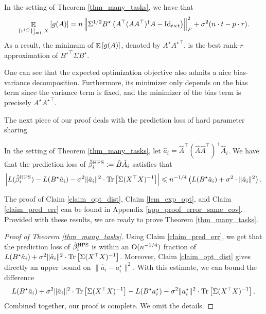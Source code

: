 	\begin{claim}\label{lem_exp_opt}
		In the setting of Theorem \ref{thm_many_tasks}, we have that
		\begin{align}
			\mathop{\mathbb{E}}_{\{\varepsilon^{(j)}\}_{j=1}^t, X}\left[ g(A) \right] = n \left\| \Sigma^{1/2} B^{\star} \left({A^{\top} (AA^{\top})^{\dagger} A - \operatorname{Id}_{t\times t}}\right) \right\|_{F}^2 + \sigma^2 (n\cdot t - p \cdot r). \label{eq_gA}
		\end{align}
		As a result, the minimum of $\mathop{\mathbb{E}}\left[ g(A) \right]$, denoted by $A^{\star}{A^\star}^\top$, is the best rank-$r$ approximation of ${B^{\star}}^{\top}\Sigma B^{\star}$.
	\end{claim}

	 One can see that the expected optimization objective also admits a nice bias-variance decomposition.
	Furthermore, its minimizer only depends on the bias term since the variance term is fixed, and the minimizer of the bias term is precisely $A^{\star} {A^{\star}}^{\top}$.

	The next piece of our proof deals with the prediction loss of hard parameter sharing.
	\begin{claim}\label{claim_pred_err}
		In the setting of Theorem \ref{thm_many_tasks},
		let $\hat{a}_i = \hat{A}^{\top} (\hat{A}\hat{A}^{\top})^{+} \hat{A}_i$.
		We have that the prediction loss of $\hat{\beta}_i^{\textup{HPS}} := \hat{B} \hat{A}_i$ satisfies that
		\begin{align*}
			{\left| {L(\hat{\beta}_i^{\textup{HPS}}) - L(B^{\star} \hat{a}_i) - \sigma^2 \|\hat{a}_i\|^2 \cdot \operatorname{Tr}\left[\Sigma (X^{\top}X)^{-1}\right]} \right|}
			\leqslant  n^{-1/4} \left( L(B^{\star} \hat{a}_i)+ \sigma^2  \cdot\|\hat a_i\|^2\right) .
		\end{align*}
	\end{claim}
	The proof of Claim \ref{claim_opt_dist}, Claim \ref{lem_exp_opt}, and Claim \ref{claim_pred_err} can be found in Appendix \ref{app_proof_error_same_cov}.
	Provided with these results, we are ready to prove Theorem \ref{thm_many_tasks}.
	\begin{proof}[Proof of Theorem \ref{thm_many_tasks}]
		Using Claim \ref{claim_pred_err}, we get that the prediction loss of $\hat{\beta}_i^{\textup{HPS}}$ is within an $\operatorname{O}(n^{-1/4})$ fraction of $L(B^{\star}\hat{a}_i)+\sigma^2\|\hat{a}_i\|^2\cdot \operatorname{Tr}\left[\Sigma(X^{\top}X)^{-1}\right]$. Moreover, Claim \ref{claim_opt_dist} gives directly an upper bound on $\|\hat a_i - a_i^\star\|^2$. With this estimate, we can bound the difference
		$$L(B^{\star}\hat{a}_i)+\sigma^2\|\hat{a}_i\|^2\cdot \operatorname{Tr}\left[\Sigma(X^{\top}X)^{-1}\right] - L(B^{\star} {a}^\star_i)-\sigma^2\|{a}^\star_i\|^2\cdot \operatorname{Tr}\left[\Sigma(X^{\top}X)^{-1}\right].$$
		Combined together, our proof is complete. We omit the details.
	\end{proof}
